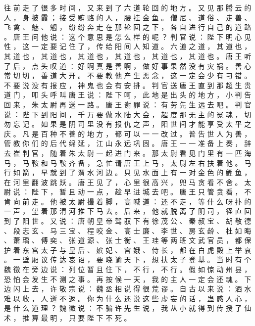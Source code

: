 {往 前 走 了 很 多 时 间 ， 又 来 到 了 六 道 轮 回 的 地 方 。
又 见 那 腾 云 的 人 ， 身 披 霞 ； 接 受 贿 赂 的 人 ， 腰 挂 金 鱼 。
僧 尼 、 道 俗 、 走 兽 、 飞 禽 、 魅 、 魍 ， 纷 纷 奔 走 在 那 轮 回 之 下 ， 各 自 进 行 自 己 的 道 路 。
唐 王 问 他 说 ： 这 个 意 思 是 怎 么 样 的 呢 ？ 判 官 说 ： 陛 下 明 心 见 性 ， 这 一 定 要 记 住 了 ， 传 给 阳 间 人 知 道 。
六 道 之 道 ， 其 道 也 ， 其 道 也 ， 其 道 也 ， 其 道 也 ， 其 道 也 ， 其 道 也 ， 其 道 也 。
唐 王 听 了 后 ， 点 头 叹 道 ： 好 啊 真 是 善 啊 ， 做 好 事 果 然 没 有 灾 祸 。
善 心 常 切 切 ， 善 道 大 开 。
不 要 教 他 产 生 恶 念 ， 这 一 定 会 少 有 刁 错 。
不 要 说 没 有 报 应 ， 神 鬼 也 会 有 安 排 。
判 官 送 唐 王 直 到 那 超 生 贵 道 门 ， 叩 头 呼 叫 唐 王 说 ： 陛 下 呵 ， 此 地 是 出 头 的 地 方 ， 小 判 告 回 来 ， 朱 太 尉 再 送 一 路 。
唐 王 谢 罪 说 ： 有 劳 先 生 远 去 吧 。
判 官 说 ： 陛 下 到 阳 间 ， 千 万 要 做 水 陆 大 会 ， 超 度 那 无 主 的 冤 魂 ， 切 勿 忘 记 。
如 果 是 阴 司 里 没 有 报 仇 之 声 ， 阳 世 间 才 能 享 受 太 平 之 庆 。
凡 是 百 种 不 善 的 地 方 ， 都 可 以 一 一 改 过 。
普 告 世 人 为 善 ， 管 教 你 们 的 后 代 绵 延 ， 江 山 永 远 巩 固 。
唐 王 一 一 准 备 上 奏 ， 辞 去 崔 判 官 ， 随 着 朱 太 尉 一 起 进 门 来 。
那 太 尉 看 见 门 里 有 一 匹 海 马 ， 马 鞍 和 马 鞍 齐 备 ， 急 忙 请 唐 王 上 马 ， 太 尉 左 右 扶 着 他 。
马 行 如 箭 ， 早 就 到 了 渭 水 河 边 。
只 见 水 面 上 有 一 对 金 色 的 鲤 鱼 ， 在 河 里 翻 波 跳 跃 。
唐 王 见 了 ， 心 里 很 高 兴 ， 兜 马 贪 看 不 舍 。
太 尉 说 ： 陛 下 ， 暂 且 动 一 点 ， 趁 早 进 城 去 吧 。
唐 王 只 管 贪 看 ， 不 肯 向 前 走 。
他 被 太 尉 撮 着 脚 ， 高 喊 道 ： 还 不 走 ， 等 什 么 呀 扑 的 一 声 ， 望 着 那 渭 河 推 下 马 去 。
后 来 ， 他 就 脱 离 了 阴 司 ， 径 直 回 到 了 阳 世 。
又 说 ： 唐 朝 皇 帝 驾 驭 下 有 徐 茂 公 、 秦 叔 宝 、 胡 敬 德 、 段 志 玄 、 马 三 宝 、 程 咬 金 、 高 士 廉 、 李 世 、 房 玄 龄 、 杜 如 晦 、 萧 瑀 、 傅 奕 、 张 道 源 、 张 士 衡 、 王 珪 等 两 班 文 武 官 员 ， 都 保 护 着 东 宫 太 子 与 皇 后 、 嫔 妃 、 宫 娥 、 侍 长 ， 都 在 白 虎 殿 上 举 哀 。
一 壁 厢 议 传 达 哀 诏 ， 要 晓 谕 天 下 ， 想 扶 太 子 登 基 。
当 时 有 个 魏 徵 在 旁 边 说 ： 列 位 暂 且 住 下 ， 不 行 ， 不 行 。
假 如 惊 动 州 县 ， 恐 怕 会 发 生 不 测 之 事 。
再 按 候 一 天 ， 我 的 主 人 一 定 会 还 魂 。
下 边 闪 上 去 ， 许 敬 宗 说 ： 魏 丞 相 说 得 很 荒 谬 。
自 古 以 来 说 ： 洒 水 难 以 收 ， 人 逝 不 返 。
你 为 什 么 还 说 这 些 虚 妄 的 话 ， 蛊 惑 人 心 ， 是 什 么 道 理 ？ 魏 徵 说 ： 不 骗 许 先 生 说 ， 我 从 小 就 得 到 传 授 了 仙 术 ， 推 算 最 明 ， 只 要 陛 下 不 死 。
}
